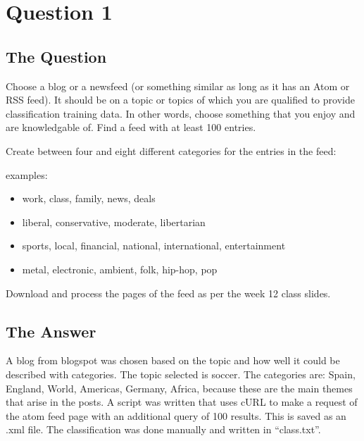 \section{Question 1}

\subsection{The Question}

\begin{flushleft}

Choose a blog or a newsfeed (or something similar as long as it has
an Atom or RSS feed).  It should be on a topic or topics of which you
are qualified to provide classification training data.  In other words,
choose something that you enjoy and are knowledgable of.  Find a feed
with at least 100 entries.

Create between four and eight different categories for the entries
in the feed:

examples: 
\begin{itemize}
\item work, class, family, news, deals

\item liberal, conservative, moderate, libertarian

\item sports, local, financial, national, international, entertainment

\item metal, electronic, ambient, folk, hip-hop, pop

\end{itemize}

Download and process the pages of the feed as per the week 12 
class slides.

\end{flushleft}


\subsection{The Answer}


A blog from blogspot was chosen based on the topic and how well it could be described with categories. The topic selected is soccer. The categories are: Spain, England, World, Americas, Germany, Africa, because these are the main themes that arise in the posts. A script was written that uses cURL to make a request of the atom feed page with an additional query of 100 results. This is saved as an .xml file. The classification was done manually and written in ``class.txt''.










